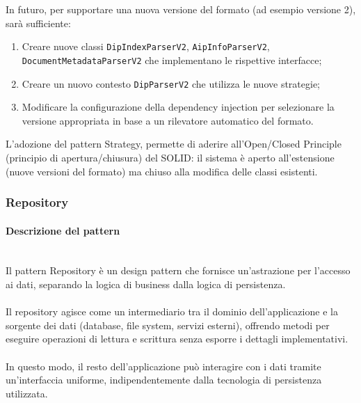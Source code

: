 \documentclass[a4paper,12pt]{article}
\begin{document}
{{{                \noindent In futuro, per supportare una nuova versione del formato (ad esempio versione 2), sarà sufficiente:
                \begin{enumerate}
                    \item Creare nuove classi \texttt{DipIndexParserV2}, \texttt{AipInfoParserV2}, \texttt{DocumentMetadataParserV2} che implementano le rispettive interfacce;
                    \item Creare un nuovo contesto \texttt{DipParserV2} che utilizza le nuove strategie;
                    \item Modificare la configurazione della dependency injection per selezionare la versione appropriata in base a un rilevatore automatico del formato.
                \end{enumerate}
                
                \noindent L'adozione del pattern Strategy, permette di aderire all'Open/Closed Principle (principio di apertura/chiusura) del SOLID: il sistema è aperto all'estensione (nuove versioni del formato) ma chiuso alla modifica delle classi esistenti.
            }
            \subsubsection{Repository}\label{sec:Repository} {
                \paragraph{Descrizione del pattern}\mbox{}\\
                Il pattern Repository è un design pattern che fornisce un’astrazione per l’accesso ai dati, separando la logica di business dalla logica di persistenza.\\
                \\
                Il repository agisce come un intermediario tra il dominio dell’applicazione e la sorgente dei dati (database, file system, servizi esterni), offrendo metodi per eseguire operazioni di lettura e scrittura senza esporre i dettagli implementativi.\\
                \\
                In questo modo, il resto dell’applicazione può interagire con i dati tramite un’interfaccia uniforme, indipendentemente dalla tecnologia di persistenza utilizzata.
                
}}}
\end{document}
